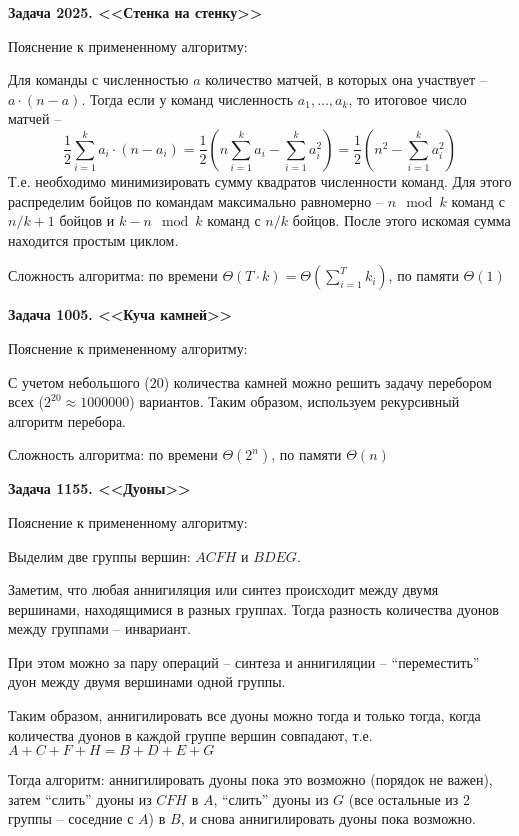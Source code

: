 \documentclass[12pt]{article}
\begin{document}
    \newcommand{\LabNumber}{1}
    

    \textbf{Задача 2025. <<Стенка на стенку>>}

    Пояснение к примененному алгоритму:

    Для команды с численностью $a$ количество матчей, в которых она участвует -- $a\cdot(n-a)$.
    Тогда если у команд численность $a_1,\dots,a_k$, то итоговое число матчей --
    \[ \frac{1}{2}\sum_{i=1}^k a_i\cdot(n-a_i)
    =\frac{1}{2}\left(n\sum_{i=1}^k a_i-\sum_{i=1}^k a_i^2\right)
    =\frac{1}{2}\left(n^2-\sum_{i=1}^k a_i^2\right) \]
    Т.е. необходимо минимизировать сумму квадратов численности команд.
    Для этого распределим бойцов по командам максимально равномерно --
    $n\mod k$ команд с $n/k+1$ бойцов и $k-n\mod k$ команд с $n/k$ бойцов.
    После этого искомая сумма находится простым циклом.

    Сложность алгоритма: по времени $\Theta(T\cdot k)=\Theta(\sum_{i=1}^T k_i)$, по памяти $\Theta(1)$

    \bigskip
    \textbf{Задача 1005. <<Куча камней>>}

    Пояснение к примененному алгоритму:

    С учетом небольшого ($20$) количества камней можно решить задачу перебором всех ($2^{20}\approx 1000000$) вариантов.
    Таким образом, используем рекурсивный алгоритм перебора.

    Сложность алгоритма: по времени $\Theta(2^n)$, по памяти $\Theta(n)$

    \bigskip
    \textbf{Задача 1155. <<Дуоны>>}

    Пояснение к примененному алгоритму:

    Выделим две группы вершин: $ACFH$ и $BDEG$.

    Заметим, что любая аннигиляция или синтез происходит между двумя вершинами, находящимися в разных группах.
    Тогда разность количества дуонов между группами -- инвариант.

    При этом можно за пару операций -- синтеза и аннигиляции -- ``переместить'' дуон между двумя вершинами одной группы.

    Таким образом, аннигилировать все дуоны можно тогда и только тогда, когда количества дуонов в каждой группе вершин совпадают,
    т.е. $A+C+F+H=B+D+E+G$

    Тогда алгоритм: аннигилировать дуоны пока это возможно (порядок не важен),
    затем ``слить'' дуоны из $CFH$ в $A$,
    ``слить'' дуоны из $G$ (все остальные из 2 группы -- соседние с $A$) в $B$,
    и снова аннигилировать дуоны пока возможно.
\end{document}
